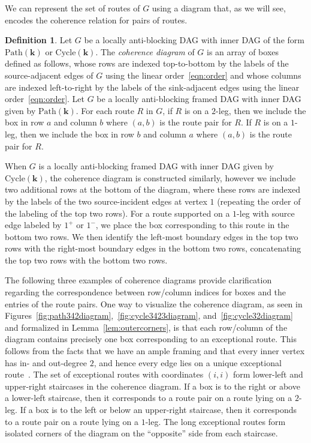 \documentclass[12pt]{amsart}
\theoremstyle{definition}
\newtheorem{definition}[theorem]{Definition}
\newcommand{\defn}[1]{\emph{\color{blue} #1}}
\newcommand\bk{\mathbf{k}}
\newcommand\Path{\mathrm{Path}}
\newcommand\Cycle{\mathrm{Cycle}}
\begin{document}
We can represent the set of routes of $G$ using a diagram that, as we will see, encodes the coherence relation for pairs of routes.

\begin{definition}\label{defn:coherence_diagram}
Let $G$ be a locally anti-blocking DAG with inner DAG of the form $\Path(\bk)$ or $\Cycle(\bk)$.
The \defn{coherence diagram} of $G$ is an array of boxes defined as follows, whose rows are indexed top-to-bottom by the labels of the source-adjacent edges of $G$ using the linear order~\eqref{eqn:order} and whose columns are indexed left-to-right by the labels of the sink-adjacent edges using the linear order~\eqref{eqn:order}.
Let $G$ be a locally anti-blocking framed DAG with inner DAG given by $\Path(\bk)$.
For each route $R$ in $G$, if $R$ is on a $2$-leg, then we include the box in row $a$ and column $b$ where $(a,b)$ is the route pair for $R$.
If $R$ is on a $1$-leg, then we include the box in row $b$ and column $a$ where $(a,b)$ is the route pair for $R$.

When $G$ is a locally anti-blocking framed DAG with inner DAG given by $\Cycle(\bk)$, the coherence diagram is constructed similarly, however we include two additional rows at the bottom of the diagram, where these rows are indexed by the labels of the two source-incident edges at vertex $1$ (repeating the order of the labeling of the top two rows).
For a route supported on a $1$-leg with source edge labeled by $1^+$ or $1^-$, we place the box corresponding to this route in the bottom two rows.
We then identify the left-most boundary edges in the top two rows with the right-most boundary edges in the bottom two rows, concatenating the top two rows with the bottom two rows.
\end{definition}

The following three examples of coherence diagrams provide clarification regarding the correspondence between row/column indices for boxes and the entries of the route pairs.
One way to visualize the coherence diagram, as seen in Figures~\ref{fig:path342diagram},~\ref{fig:cycle3423diagram}, and~\ref{fig:cycle32diagram} and formalized in Lemma~\ref{lem:outercorners}, is that each row/column of the diagram contains precisely one box corresponding to an exceptional route.
This follows from the facts that we have an ample framing and that every inner vertex has in- and out-degree $2$, and hence every edge lies on a unique exceptional route~\cite{Polytopes2}.
The set of exceptional routes with coordinates $(i,i)$ form lower-left and upper-right staircases in the coherence diagram.
If a box is to the right or above a lower-left staircase, then it corresponds to a route pair on a route lying on a $2$-leg.
If a box is to the left or below an upper-right staircase, then it corresponds to a route pair on a route lying on a $1$-leg.
The long exceptional routes form isolated corners of the diagram on the ``opposite'' side from each staircase.
\end{document}
